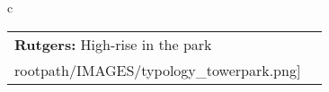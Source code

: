 \begin{table}[H]
        \begin{tabular}{c}
        \begin{tabular}{m{1.5in} m{2in}}
\textbf{Rutgers:} {High-rise in the park} & \texttt{[image: \\rootpath/IMAGES/typology\_towerpark.png]}
\end{tabular}\end{tabular}
        \end{table}